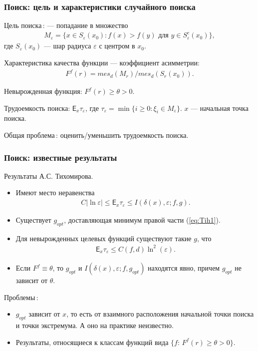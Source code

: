 \documentclass[pdf, intlimits, 9pt, unicode]{beamer} %
\begin{document}
\begin{frame}
    \frametitle{Поиск: цель и характеристики случайного поиска}
    {\alert{Цель поиска\,:}} --- попадание в множество
    \begin{gather*}
        M_\varepsilon=\{x\in S_\varepsilon(x_0):f(x)>f(y)\text{ для
        }y\in S_\varepsilon^c(x_0)\},
    \end{gather*}
    где $S_\varepsilon(x_0)$ --- шар радиуса $\varepsilon$ с центром в
    $x_0$.

    Характеристика качества функции --- коэффициент асимметрии:
    \begin{gather*}
        F^f(r)=mes_d(M_r)/mes_d(S_r(x_0)).
    \end{gather*}

    {\alert{Невырожденная}} функция: $F^f(r)\geq \theta>0$.

    {\alert{Трудоемкость}} поиска: $\mathsf{E}_x\tau_\varepsilon$,
    где $\tau_\varepsilon=\min\{i\geq0:\xi_i\in M_\varepsilon\}$.  $x$
    --- начальная точка поиска.

    {\alert{Общая проблема\,:}} оценить/уменьшить трудоемкость
    поиска.
\end{frame}

\begin{frame}
    \frametitle{Поиск: известные результаты}
    \alert{Результаты А.С. Тихомирова.}
    \begin{itemize}
        \item Имеют место неравенства
        \begin{gather}
            \label{eq:Tih1}
            C|\ln\varepsilon|\leq \mathsf{E}_x\tau_\varepsilon\leq
            I(\delta(x),\varepsilon;f,g).
        \end{gather}
        \item Существует $g_{opt}$, доставляющая минимум правой части
        (\ref{eq:Tih1}).
        \item Для невырожденных целевых функций существуют такие $g$,
        что
        \begin{gather*}
            \mathsf{E}_x\tau_\varepsilon\leq C(f,d)\ln^2(\varepsilon).
        \end{gather*}
        \item Если $F^f\equiv\theta$, то $g_{opt}$ и
        $I(\delta(x),\varepsilon;f,g_{opt})$ находятся явно, причем
        $g_{opt}$ не зависит от $\theta$.
    \end{itemize}

    \alert{Проблемы\,:}
    \begin{itemize}
        \item $g_{opt}$ зависит от $x$, то есть от взаимного
        расположения начальной точки поиска и точки экстремума. А оно
        на практике неизвестно.
        \item Результаты, относящиеся к классам функций вида
        $\{f:\,F^f(r)\geq \theta>0\}$.
    \end{itemize}
\end{frame}
\end{document}
